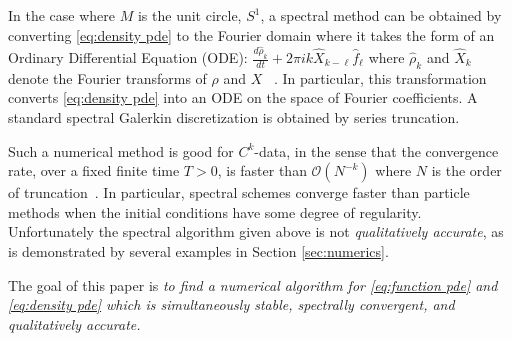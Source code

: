 \documentclass[final,leqno]{siamart}
\begin{document}
In the case where $M$ is the unit circle, $S^{1}$, a spectral method can be obtained by converting \eqref{eq:density pde} to the Fourier domain where it takes the form
of an Ordinary Differential Equation (ODE):
$
	\frac{d \hat{\rho}_{k}}{dt} + 2\pi i k  \widehat{X}_{k-\ell} \hat{f}_{\ell} 
$
where $\hat{\rho}_{k}$ and $\widehat{X}_{k}$ denote the Fourier transforms of $\rho$ and $X$ ~\cite{Taylor1974}.
In particular, this transformation converts \eqref{eq:density pde} into an ODE on the space of Fourier coefficients.
A standard spectral Galerkin discretization is obtained by series truncation. 

Such a numerical method is good for $C^{k}$-data, in the sense that the convergence rate, over a fixed finite time $T>0$, is faster than $\mathcal{O}(N^{-k})$  where $N$ is the order of truncation~\cite{Boyd2001,Gottlieb2001,Gottlieb1977numerical}.
In particular, spectral schemes converge faster than particle methods when the initial conditions have some degree of regularity.
Unfortunately the spectral algorithm given above is not \emph{qualitatively accurate}, as is demonstrated by several examples in Section \ref{sec:numerics}.

The goal of this paper is
\emph{to find a numerical algorithm for \eqref{eq:function pde} and \eqref{eq:density pde} which is simultaneously stable, spectrally convergent, and qualitatively accurate.}
\end{document}
